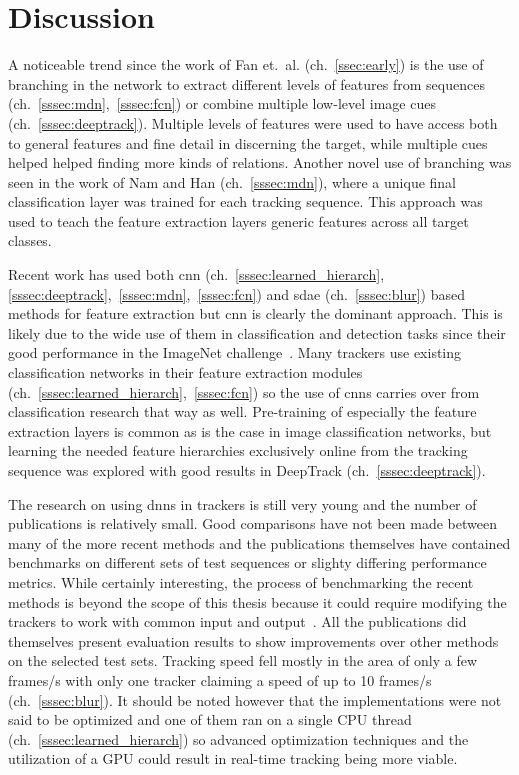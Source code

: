 
\section{Discussion}
A noticeable trend since the work of Fan et.~al. (ch.~\ref{ssec:early}) is the use of branching in the network to extract different levels of features from sequences (ch.~\ref{sssec:mdn},~\ref{sssec:fcn}) or combine multiple low-level image cues (ch.~\ref{sssec:deeptrack}). Multiple levels of features were used to have access both to general features and fine detail in discerning the target, while multiple cues helped helped finding more kinds of relations. Another novel use of branching was seen in the work of Nam and Han (ch.~\ref{sssec:mdn}), where a unique final classification layer was trained for each tracking sequence. This approach was used to teach the feature extraction layers generic features across all target classes.

Recent work has used both \ac{cnn} (ch.~\ref{sssec:learned_hierarch},\ref{sssec:deeptrack},~\ref{sssec:mdn},~\ref{sssec:fcn}) and \ac{sdae} (ch.~\ref{sssec:blur}) based methods for feature extraction but \ac{cnn} is clearly the dominant approach. This is likely due to the wide use of them in classification and detection tasks since their good performance in the ImageNet challenge~\cite{NIPS_IMAGENET}. Many trackers use existing classification networks in their feature extraction modules (ch.~\ref{sssec:learned_hierarch},~\ref{sssec:fcn}) so the use of \ac{cnn}s carries over from classification research that way as well. Pre-training of especially the feature extraction layers is common as is the case in image classification networks, but learning the needed feature hierarchies exclusively online from the tracking sequence was explored with good results in DeepTrack (ch.~\ref{sssec:deeptrack}).

The research on using \ac{dnn}s in trackers is still very young and the number of publications is relatively small. Good comparisons have not been made between many of the more recent methods and the publications themselves have contained benchmarks on different sets of test sequences or slighty differing performance metrics. While certainly interesting, the process of benchmarking the recent methods is beyond the scope of this thesis because it could require modifying the trackers to work with common input and output~\cite{OT_BENCH}. All the publications did themselves present evaluation results to show improvements over other methods on the selected test sets. Tracking speed fell mostly in the area of only a few frames/s with only one tracker claiming a speed of up to 10 frames/s (ch.~\ref{sssec:blur}). It should be noted however that the implementations were not said to be optimized and one of them ran on a single CPU thread (ch.~\ref{sssec:learned_hierarch}) so advanced optimization techniques and the utilization of a GPU could result in real-time tracking being more viable.
